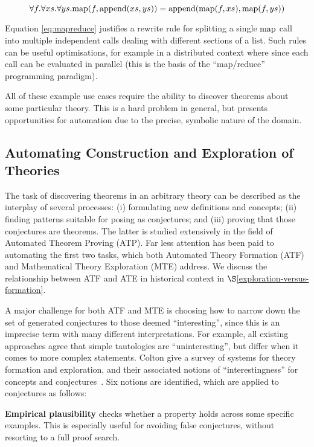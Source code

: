 \begin{equation} \label{eq:mapreduce}
  \forall f. \forall xs. \forall ys.
    \text{map}(f, \text{append}(xs, ys)) = \text{append}(\text{map}(f, xs), \text{map}(f, ys))
\end{equation}

Equation \ref{eq:mapreduce} justifies a rewrite rule for splitting a single
$\text{map}$ call into multiple independent calls dealing with different sections of a
list. Such rules can be useful optimisations, for example in a distributed
context where since each call can be evaluated in parallel (this is the basis of
the ``map/reduce'' programming paradigm).

All of these example use cases require the ability to discover theorems about
some particular theory. This is a hard problem in general, but presents
opportunities for automation due to the precise, symbolic nature of the domain.

\subsection{Automating Construction and Exploration of Theories}
\label{sec:te}

The task of discovering theorems in an arbitrary theory can be
described as the interplay of several processes: (i) formulating new
definitions and concepts; (ii) finding patterns suitable for posing as
conjectures; and (iii) proving that those conjectures are theorems.
The latter is studied extensively in the field of Automated Theorem
Proving (ATP). Far less attention has been paid to automating the
first two tasks, which both Automated Theory Formation (ATF) and
Mathematical Theory Exploration (MTE) address.  We discuss the relationship
between ATF and ATE in historical context in
$\S$\ref{exploration-versus-formation}.

A major challenge for both ATF and MTE is choosing how to narrow down
the set of generated conjectures to those deemed ``interesting'', since this is
an imprecise term with many different interpretations. For example, all existing
approaches agree that simple tautologies are ``uninteresting'', but differ when
it comes to more complex statements.  Colton \etal{} give a survey of systems for
theory formation and exploration, and their associated notions of
``interestingness'' for concepts and conjectures~\cite{colton2000notion}. Six
notions are identified, which are applied to conjectures as follows:

{\bf Empirical plausibility} checks whether a property holds across some
specific examples. This is especially useful for avoiding false conjectures,
without resorting to a full proof search.

